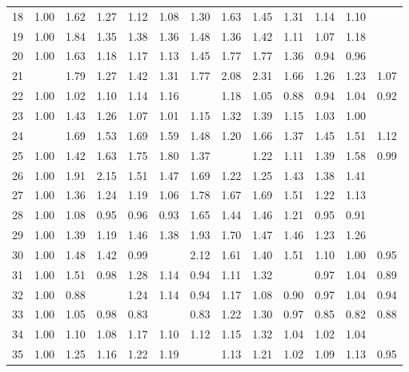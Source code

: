 \begin{tabular}{rrrrrrrrrrrrr}
  18 & 1.00 & 1.62 & 1.27 & 1.12 & 1.08 & 1.30 & 1.63 & 1.45 & 1.31 & 1.14 & 1.10 & \color{blue}{0.96} \\ 
  19 & 1.00 & 1.84 & 1.35 & 1.38 & 1.36 & 1.48 & 1.36 & 1.42 & 1.11 & 1.07 & 1.18 & \color{blue}{0.97} \\ 
  20 & 1.00 & 1.63 & 1.18 & 1.17 & 1.13 & 1.45 & 1.77 & 1.77 & 1.36 & 0.94 & 0.96 & \color{blue}{0.86} \\ 
  21 & \color{blue}{1.00} & 1.79 & 1.27 & 1.42 & 1.31 & 1.77 & 2.08 & 2.31 & 1.66 & 1.26 & 1.23 & 1.07 \\ 
  22 & 1.00 & 1.02 & 1.10 & 1.14 & 1.16 & \color{blue}{0.78} & 1.18 & 1.05 & 0.88 & 0.94 & 1.04 & 0.92 \\ 
  23 & 1.00 & 1.43 & 1.26 & 1.07 & 1.01 & 1.15 & 1.32 & 1.39 & 1.15 & 1.03 & 1.00 & \color{blue}{0.90} \\ 
  24 & \color{blue}{1.00} & 1.69 & 1.53 & 1.69 & 1.59 & 1.48 & 1.20 & 1.66 & 1.37 & 1.45 & 1.51 & 1.12 \\ 
  25 & 1.00 & 1.42 & 1.63 & 1.75 & 1.80 & 1.37 & \color{blue}{0.95} & 1.22 & 1.11 & 1.39 & 1.58 & 0.99 \\ 
  26 & 1.00 & 1.91 & 2.15 & 1.51 & 1.47 & 1.69 & 1.22 & 1.25 & 1.43 & 1.38 & 1.41 & \color{blue}{1.00} \\ 
  27 & 1.00 & 1.36 & 1.24 & 1.19 & 1.06 & 1.78 & 1.67 & 1.69 & 1.51 & 1.22 & 1.13 & \color{blue}{0.90} \\ 
  28 & 1.00 & 1.08 & 0.95 & 0.96 & 0.93 & 1.65 & 1.44 & 1.46 & 1.21 & 0.95 & 0.91 & \color{blue}{0.87} \\ 
  29 & 1.00 & 1.39 & 1.19 & 1.46 & 1.38 & 1.93 & 1.70 & 1.47 & 1.46 & 1.23 & 1.26 & \color{blue}{0.92} \\ 
  30 & 1.00 & 1.48 & 1.42 & 0.99 & \color{blue}{0.95} & 2.12 & 1.61 & 1.40 & 1.51 & 1.10 & 1.00 & 0.95 \\ 
  31 & 1.00 & 1.51 & 0.98 & 1.28 & 1.14 & 0.94 & 1.11 & 1.32 & \color{blue}{0.88} & 0.97 & 1.04 & 0.89 \\ 
  32 & 1.00 & 0.88 & \color{blue}{0.83} & 1.24 & 1.14 & 0.94 & 1.17 & 1.08 & 0.90 & 0.97 & 1.04 & 0.94 \\ 
  33 & 1.00 & 1.05 & 0.98 & 0.83 & \color{blue}{0.80} & 0.83 & 1.22 & 1.30 & 0.97 & 0.85 & 0.82 & 0.88 \\ 
  34 & 1.00 & 1.10 & 1.08 & 1.17 & 1.10 & 1.12 & 1.15 & 1.32 & 1.04 & 1.02 & 1.04 & \color{blue}{0.97} \\ 
  35 & 1.00 & 1.25 & 1.16 & 1.22 & 1.19 & \color{blue}{0.91} & 1.13 & 1.21 & 1.02 & 1.09 & 1.13 & 0.95 \\ 

\end{tabular}
